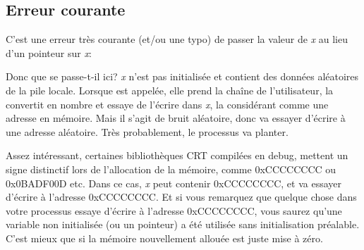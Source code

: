 \subsection{Erreur courante}

C'est une erreur très courante (et/ou une typo) de passer la valeur de \emph{x} au
lieu d'un pointeur sur \emph{x}:



Donc que se passe-t-il ici?
\emph{x} n'est pas initialisée et contient des données aléatoires de la pile locale.
Lorsque \scanf est appelée, elle prend la chaîne de l'utilisateur, la convertit
en nombre et essaye de l'écrire dans \emph{x}, la considérant comme une adresse en
mémoire.
Mais il s'agit de bruit aléatoire, donc \scanf va essayer d'écrire à une adresse
aléatoire.
Très probablement, le processus va planter.

Assez intéressant, certaines bibliothèques \ac{CRT} compilées en debug, mettent
un signe distinctif lors de l'allocation de la mémoire, comme 0xCCCCCCCC ou
0x0BADF00D etc.
Dans ce cas, \emph{x} peut contenir 0xCCCCCCCC, et \scanf va essayer d'écrire à
l'adresse 0xCCCCCCCC.
Et si vous remarquez que quelque chose dans votre processus essaye d'écrire à
l'adresse 0xCCCCCCCC, vous saurez qu'une variable non initialisée (ou un pointeur)
a été utilisée sans initialisation préalable.
C'est mieux que si la mémoire nouvellement allouée est juste mise à zéro.

